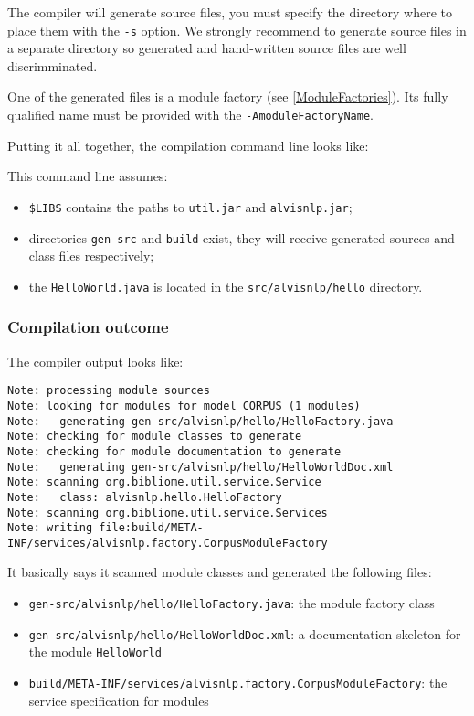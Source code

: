 \documentclass[a4paper]{article}
\begin{document}
The compiler will generate source files, you must specify the directory where to place them with the \texttt{-s} option.
We strongly recommend to generate source files in a separate directory so generated and hand-written source files are well discrimminated.

One of the generated files is a module factory (see \ref{ModuleFactories}).
Its fully qualified name must be provided with the \texttt{-AmoduleFactoryName}.

Putting it all together, the compilation command line looks like:


This command line assumes:
\begin{itemize}
\item \texttt{\$LIBS} contains the paths to \texttt{util.jar} and \texttt{alvisnlp.jar};
\item directories \texttt{gen-src} and \texttt{build} exist, they will receive generated sources and class files respectively;
\item the \texttt{HelloWorld.java} is located in the \texttt{src/alvisnlp/hello} directory.
\end{itemize}

\subsubsection{Compilation outcome}
The compiler output looks like:
\begin{verbatim}
Note: processing module sources
Note: looking for modules for model CORPUS (1 modules)
Note:   generating gen-src/alvisnlp/hello/HelloFactory.java
Note: checking for module classes to generate
Note: checking for module documentation to generate
Note:   generating gen-src/alvisnlp/hello/HelloWorldDoc.xml
Note: scanning org.bibliome.util.service.Service
Note:   class: alvisnlp.hello.HelloFactory
Note: scanning org.bibliome.util.service.Services
Note: writing file:build/META-INF/services/alvisnlp.factory.CorpusModuleFactory
\end{verbatim}

It basically says it scanned module classes and generated the following files:
\begin{itemize}
\item \texttt{gen-src/alvisnlp/hello/HelloFactory.java}: the module factory class
\item \texttt{gen-src/alvisnlp/hello/HelloWorldDoc.xml}: a documentation skeleton for the module \texttt{HelloWorld}
\item \texttt{build/META-INF/services/alvisnlp.factory.CorpusModuleFactory}: the service specification for modules
\end{itemize}
\end{document}
